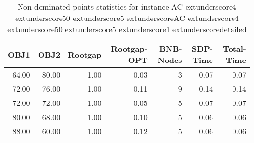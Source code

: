 \begin{table}
\caption{Non-dominated points statistics for instance AC	extunderscore4	extunderscore50	extunderscore5	extunderscoreAC	extunderscore4	extunderscore50	extunderscore5	extunderscore1	extunderscoredetailed}
\label{tab:stats/AC_4_50_5_AC_4_50_5_1_detailed}
\begin{tabular}{rrrrrrr}
\toprule
OBJ1 & OBJ2 & Rootgap & Rootgap-OPT & BNB-Nodes & SDP-Time & Total-Time \\
\midrule
64.00 & 80.00 & 1.00 & 0.03 & 3 & 0.07 & 0.07 \\
72.00 & 76.00 & 1.00 & 0.11 & 9 & 0.14 & 0.14 \\
72.00 & 72.00 & 1.00 & 0.05 & 5 & 0.07 & 0.07 \\
80.00 & 68.00 & 1.00 & 0.10 & 5 & 0.06 & 0.06 \\
88.00 & 60.00 & 1.00 & 0.12 & 5 & 0.06 & 0.06 \\
\bottomrule
\end{tabular}
\end{table}
